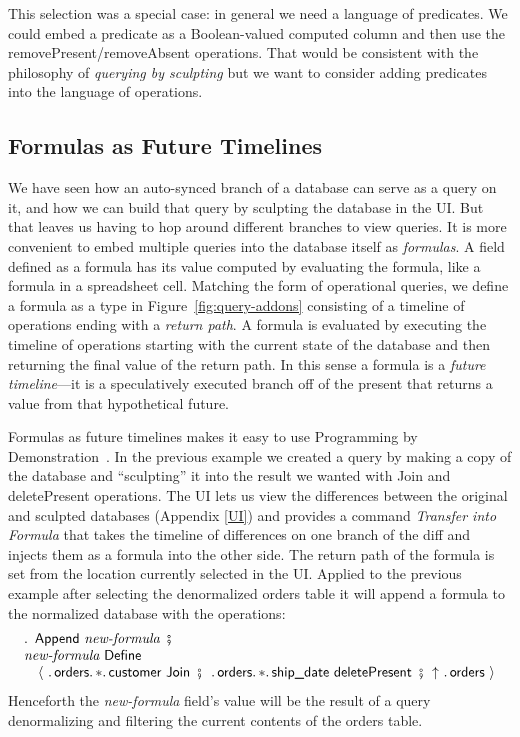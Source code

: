 \documentclass[english,submission]{programming}
\theoremstyle{definition}
\DeclareMathOperator{\exec}{\ \fatsemi\ \ }
\begin{document}
This selection was a special case: in general we need a language of predicates. We could embed a predicate as a Boolean-valued computed column and then use the \textsf{removePresent/removeAbsent} operations. That would be consistent with the philosophy of \textit{querying by sculpting} but we want to consider adding predicates into the language of operations.


\subsection{Formulas as Future Timelines}\label{formulas}

We have seen how an auto-synced branch of a database can serve as a query on it, and how we can build that query by sculpting the database in the UI. But that leaves us having to hop around different branches to view queries. It is more convenient to embed multiple queries into the database itself as \textit{formulas}. A field defined as a formula has its value computed by evaluating the formula, like a formula in a spreadsheet cell. Matching the form of operational queries, we define a formula as a type in Figure~\ref{fig:query-addons} consisting of a timeline of operations ending with a \textit{return path}. A formula is evaluated by executing the timeline of operations starting with the current state of the database and then returning the final value of the return path. In this sense a formula is a \textit{future timeline}---it is a speculatively executed branch off of the present that returns a value from that hypothetical future.

Formulas as future timelines makes it easy to use Programming by Demonstration~\cite{cypher93-pbd}. In the previous example we created a query by making a copy of the database and ``sculpting'' it into the result we wanted with \textsf{Join} and \textsf{deletePresent} operations. The UI lets us view the differences between the original and sculpted databases (Appendix \ref{UI}) and provides a command \textit{Transfer into Formula} that takes the timeline of differences on one branch of the diff and injects them as a formula into the other side. The return path of the formula is set from the location currently selected in the UI. Applied to the previous example after selecting the denormalized \textsf{orders} table it will append a formula to the normalized database with the operations:
\[
\begin{array}{l}
  \ldotp \textsf{ Append } \textit{new-formula} \exec\\
  \textit{new-formula} \textsf{ Define } \\
  \quad \langle
\ \ldotp \textsf{orders}\ldotp * \ldotp \textsf{customer Join} \exec
\ldotp \textsf{orders}\ldotp * \ldotp \textsf{ship\_date deletePresent} \exec
\!\!\uparrow \ \ldotp \textsf{orders}\
  \rangle\\
\end{array}
\]
Henceforth the \textit{new-formula} field's value will be the result of a query  denormalizing and filtering the current contents of the orders table.
\end{document}

